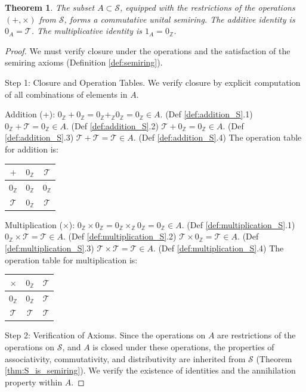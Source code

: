 \documentclass[11pt, a4paper]{article}
\theoremstyle{plain}
\newtheorem{theorem}{Theorem}[section]
\theoremstyle{definition}
\numberwithin{equation}{section}
\newcommand{\Z}{\mathbb{Z}}
\newcommand{\Tobj}{\mathcal{T}} %
\newcommand{\SemiringS}{\mathcal{S}}
\begin{document}
\begin{theorem}\label{thm:structure_A}
The subset $A \subset \SemiringS$, equipped with the restrictions of the operations $(+, \times)$ from $\SemiringS$, forms a commutative unital semiring. The additive identity is $0_A=\Tobj$. The multiplicative identity is $1_A=0_{\Z}$.
\end{theorem}
\begin{proof}
We must verify closure under the operations and the satisfaction of the semiring axioms (Definition \ref{def:semiring}).

Step 1: Closure and Operation Tables.
We verify closure by explicit computation of all combinations of elements in $A$.

Addition (+):
$0_{\Z}+0_{\Z} = 0_{\Z}+_{\Z} 0_{\Z} = 0_{\Z} \in A$. (Def \ref{def:addition_S}.1)
$0_{\Z}+\Tobj = 0_{\Z} \in A$. (Def \ref{def:addition_S}.2)
$\Tobj+0_{\Z} = 0_{\Z} \in A$. (Def \ref{def:addition_S}.3)
$\Tobj+\Tobj = \Tobj \in A$. (Def \ref{def:addition_S}.4)
The operation table for addition is:
\begin{center}
\begin{tabular}{c|cc}
$+$ & $0_{\Z}$ & $\Tobj$ \\
\hline
$0_{\Z}$ & $0_{\Z}$ & $0_{\Z}$ \\
$\Tobj$ & $0_{\Z}$ & $\Tobj$
\end{tabular}
\end{center}

Multiplication ($\times$):
$0_{\Z}\times 0_{\Z} = 0_{\Z}\times_{\Z} 0_{\Z} = 0_{\Z} \in A$. (Def \ref{def:multiplication_S}.1)
$0_{\Z}\times\Tobj = \Tobj \in A$. (Def \ref{def:multiplication_S}.2)
$\Tobj\times 0_{\Z} = \Tobj \in A$. (Def \ref{def:multiplication_S}.3)
$\Tobj\times\Tobj = \Tobj \in A$. (Def \ref{def:multiplication_S}.4)
The operation table for multiplication is:
\begin{center}
\begin{tabular}{c|cc}
$\times$ & $0_{\Z}$ & $\Tobj$ \\
\hline
$0_{\Z}$ & $0_{\Z}$ & $\Tobj$ \\
$\Tobj$ & $\Tobj$ & $\Tobj$
\end{tabular}
\end{center}

Step 2: Verification of Axioms.
Since the operations on $A$ are restrictions of the operations on $\SemiringS$, and $A$ is closed under these operations, the properties of associativity, commutativity, and distributivity are inherited from $\SemiringS$ (Theorem \ref{thm:S_is_semiring}). We verify the existence of identities and the annihilation property within $A$.


\end{proof}
\end{document}
